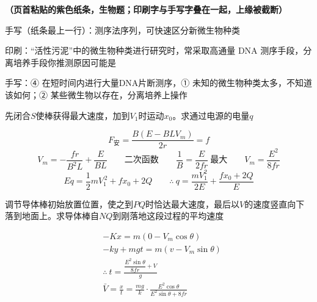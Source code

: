 \textbf{（页首粘贴的紫色纸条，生物题；印刷字与手写字叠在一起，上缘被截断）}

手写（纸条最上一行）：测序法序列，可快速区分新微生物种类

印刷：“活性污泥”中的微生物种类进行研究时，常采取高通量 DNA 测序手段，分离培养手段你推测原因可能是

手写：④ 在短时间内进行大量DNA片断测序，① 未知的微生物种类太多，不知道该如何；② 某些微生物以存在，分离培养上操作
\begin{problem}[圈注“求和”]
先闭合$S$使棒获得最大速度，加到$V_1$时运动$x_0$。求通过电源的电量$q$
\begin{solution}
\[
F_{\text{安}}=\frac{B(E-BLV_m)}{2r}=f
\]
\[
V_m=-\frac{fr}{B^2L}+\frac{E}{BL}\qquad\text{二次函数}\qquad \frac1B=\frac{E}{2fr}\ \text{最大}\qquad V_m=\frac{E^2}{8fr}
\]
\[
Eq=\frac12mV_1^{\,2}+fx_0+2Q\qquad\therefore\ q=\frac{mV_1^{2}}{2E}+\frac{fx_0+2Q}{E}
\]
\end{solution}
\end{problem}
\begin{problem}
调节导体棒初始放置位置，使之到$PQ$时恰达最大速度，最后以$V$的速度竖直向下落到地面上。求导体棒自$NQ$到刚落地这段过程的平均速度
\begin{solution}
\medskip
\noindent\hspace{2cm}
\begin{align*}
&-Kx=m(0-V_m\cos\theta)\\
&-ky+mgt=m(v-V_m\sin\theta)\\
&\therefore\ t=\frac{\dfrac{E^2\sin\theta}{8fr}+V}{g}\\
&\bar V=\frac{x}{t}=\frac{mg}{k}\cdot\frac{E^2\cos\theta}{E^2\sin\theta+8fr}
\end{align*}
\end{solution}
\end{problem}
